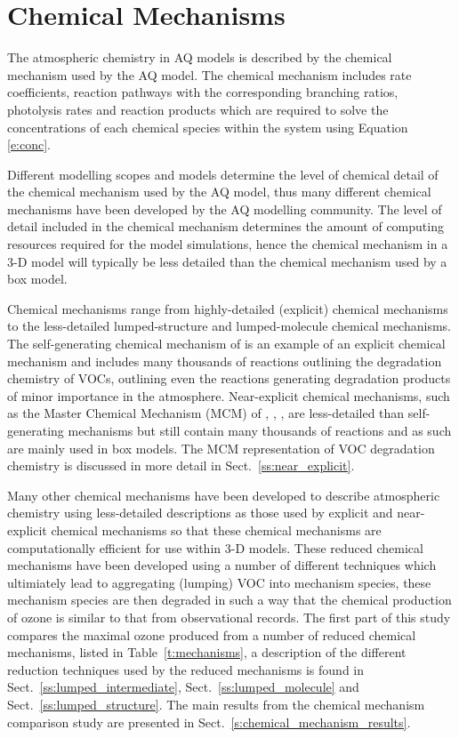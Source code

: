 \section{Chemical Mechanisms} \label{s:chemical_mechanisms}
The atmospheric chemistry in AQ models is described by the chemical mechanism used by the AQ model. 
The chemical mechanism includes rate coefficients, reaction pathways with the corresponding branching ratios, photolysis rates and reaction products which are required to solve the concentrations of each chemical species within the system using Equation \eqref{e:conc}.

Different modelling scopes and models determine the level of chemical detail of the chemical mechanism used by the AQ model, thus many different chemical mechanisms have been developed by the AQ modelling community.
The level of detail included in the chemical mechanism determines the amount of computing resources required for the model simulations, hence the chemical mechanism in a 3-D model will typically be less detailed than the chemical mechanism used by a box model.

Chemical mechanisms range from highly-detailed (explicit) chemical mechanisms to the less-detailed lumped-structure and lumped-molecule chemical mechanisms.
The self-generating chemical mechanism of \citet{Aumont:2005} is an example of an explicit chemical mechanism and includes many thousands of reactions outlining the degradation chemistry of VOCs, outlining even the reactions generating degradation products of minor importance in the atmosphere.
Near-explicit chemical mechanisms, such as the Master Chemical Mechanism (MCM) of \citet{Jenkin:1997}, \citet{Jenkin:2003}, \citet{Saunders:2003}, are less-detailed than self-generating mechanisms but still contain many thousands of reactions and as such are mainly used in box models.
The MCM representation of VOC degradation chemistry is discussed in more detail in Sect.~\ref{ss:near_explicit}.

Many other chemical mechanisms have been developed to describe atmospheric chemistry using less-detailed descriptions as those used by explicit and near-explicit chemical mechanisms so that these chemical mechanisms are computationally efficient for use within 3-D models.
These reduced chemical mechanisms have been developed using a number of different techniques which ultimiately lead to aggregating (lumping) VOC into mechanism species, these mechanism species are then degraded in such a way that the chemical production of ozone is similar to that from observational records.
The first part of this study compares the maximal ozone produced from a number of reduced chemical mechanisms, listed in Table~\ref{t:mechanisms}, a description of the different reduction techniques used by the reduced mechanisms is found in Sect.~\ref{ss:lumped_intermediate}, Sect.~\ref{ss:lumped_molecule} and Sect.~\ref{ss:lumped_structure}.
The main results from the chemical mechanism comparison study are presented in Sect.~\ref{s:chemical_mechanism_results}.

